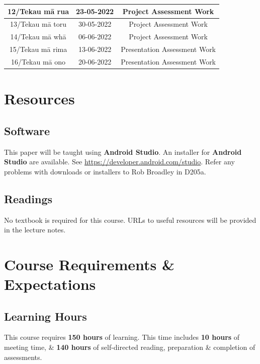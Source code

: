 \documentclass{article}
\begin{document}
\begin{tabular}{|c|c|c|c|}
	\small 12/Tekau mā rua  & \small 23-05-2022 & \multicolumn{2}{c|}{\small Project Assessment Work}                                      \\ \hline
	\small 13/Tekau mā toru & \small 30-05-2022 & \multicolumn{2}{c|}{\small Project Assessment Work}                                      \\ \hline
	\small 14/Tekau mā whā  & \small 06-06-2022 & \multicolumn{2}{c|}{\small Project Assessment Work}                                      \\ \hline
	\small 15/Tekau mā rima & \small 13-06-2022 & \multicolumn{2}{c|}{\small Presentation Assessment Work}                                 \\ \hline
	\small 16/Tekau mā ono  & \small 20-06-2022 & \multicolumn{2}{c|}{\small Presentation Assessment Work}                                 \\ \hline
\end{tabular}

\section*{Resources}

\subsection*{Software}
This paper will be taught using \textbf{Android Studio}. An installer for \textbf{Android Studio} are available. See \href{https://developer.android.com/studio/}{https://developer.android.com/studio}. Refer any problems with downloads or installers to Rob Broadley in D205a.

\subsection*{Readings}
No textbook is required for this course. URLs to useful resources will be provided in the lecture notes.

\section*{Course Requirements \& Expectations}

\subsection*{Learning Hours}
This course requires \textbf{150 hours} of learning. This time includes \textbf{10 hours} of meeting time, \& \textbf{140 hours} of self-directed reading, preparation \& completion of assessments.
\end{document}
